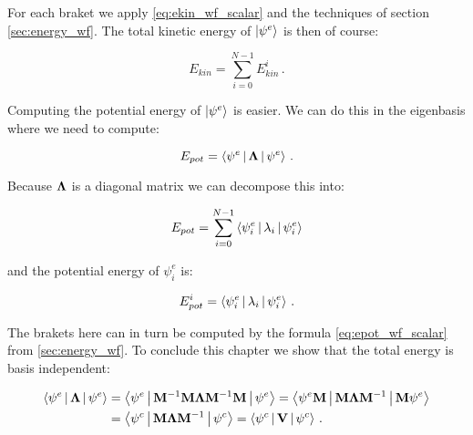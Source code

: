 For each braket we apply \eqref{eq:ekin_wf_scalar} and the techniques of
section \ref{sec:energy_wf}. The total kinetic energy of $\Ket{\psi^{e}}$ is
then of course:

\begin{equation}
  E_{kin} = \sum_{i=0}^{N-1} E^i_{kin} \,.
\end{equation}

Computing the potential energy of $\Ket{\psi^{e}}$ is easier. We can do this in the
eigenbasis where we need to compute:

\begin{equation*}
  E_{pot} = \Braket{\psi^{e} | \mathbf{\Lambda} | \psi^{e}} \,.
\end{equation*}

Because $\mathbf{\Lambda}$ is a diagonal matrix we can decompose this into:

\begin{equation*}
  E_{pot} = \sum_{i=0}^{N-1} \Braket{\psi^{e}_i | \lambda_i | \psi^{e}_i}
\end{equation*}

and the potential energy of $\psi^{e}_i$ is:

\begin{equation}
  E_{pot}^i = \Braket{\psi^{e}_i | \lambda_i | \psi^{e}_i} \,.
\end{equation}

The brakets here can in turn be computed by the formula \eqref{eq:epot_wf_scalar}
from \ref{sec:energy_wf}. To conclude this chapter we show that the total energy
is basis independent:

\begin{align*}
  \Braket{\psi^{e} | \mathbf{\Lambda} | \psi^{e}}
  & =
  \Braket{\psi^{e} | \mathbf{M}{}^{-1} \mathbf{M} \mathbf{\Lambda} \mathbf{M}{}^{-1} \mathbf{M} | \psi^{e}}
  =
  \Braket{\psi^{e} \mathbf{M} | \mathbf{M} \mathbf{\Lambda} \mathbf{M}{}^{-1} | \mathbf{M} \psi^{e}} \\
  & =
  \Braket{\psi^{c} | \mathbf{M} \mathbf{\Lambda} \mathbf{M}{}^{-1} | \psi^{c}}
  =
  \Braket{\psi^{c} | \mathbf{V} | \psi^{c}} \,.
\end{align*}
